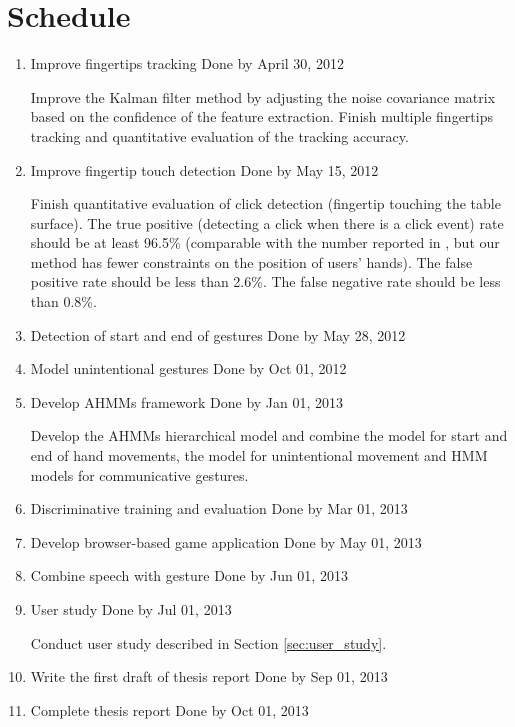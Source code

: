 \section{Schedule}
\begin{enumerate}
  \item Improve fingertips tracking \hfill Done by April 30, 2012

  Improve the Kalman filter method by adjusting the noise covariance matrix
  based on the confidence of the feature extraction. Finish multiple fingertips
  tracking and quantitative evaluation of the tracking accuracy.
  
  \item Improve fingertip touch detection \hfill Done by May 15, 2012
  
  Finish quantitative evaluation of click detection (fingertip touching the
  table surface). The true positive (detecting a click when there is a click
  event) rate should be at least 96.5\% (comparable with the number reported in
  \cite{harrison11}, but our method has fewer constraints on the position of users' hands). The false positive rate should
  be less than 2.6\%. The false negative rate should be less than 0.8\%.

  \item Detection of start and end of gestures \hfill Done by May 28, 2012

  \item Model unintentional gestures \hfill Done by Oct 01, 2012

  \item Develop AHMMs framework	\hfill Done by Jan 01, 2013

  Develop the AHMMs hierarchical model and combine the model for start and
  end of hand movements, the model for unintentional movement and HMM models for
  communicative gestures. 
  
  \item Discriminative training and evaluation \hfill Done by Mar 01, 2013
  
  \item Develop browser-based game application \hfill Done by May 01, 2013
    
  \item Combine speech with gesture	\hfill Done by Jun 01, 2013

  \item User study \hfill Done by Jul 01, 2013

  Conduct user study described in Section \ref{sec:user_study}.
  
  \item Write the first draft of thesis report \hfill Done by Sep 01, 2013
  \item Complete thesis report	\hfill Done by Oct 01, 2013
  \end{enumerate}


